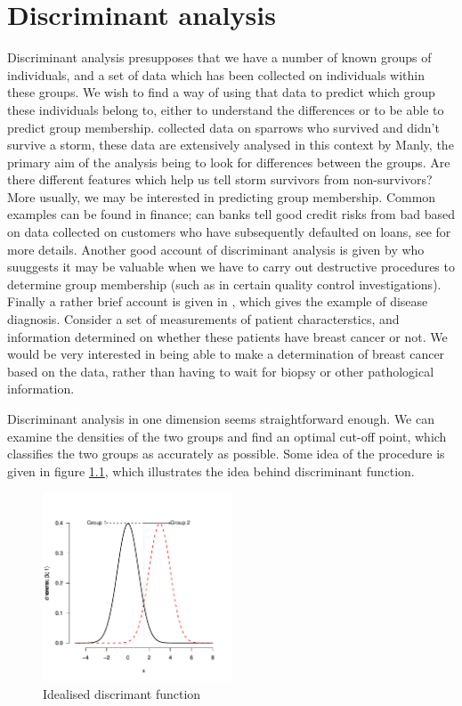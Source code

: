 \chapter{Discriminant analysis}
\label{discriminant}

Discriminant analysis presupposes that we have a number of known groups of individuals, and a set of data which has been collected on individuals within these groups.   We wish to find a way of using that data to predict which group these individuals belong to, either to understand the differences or to be able to predict group membership.  \cite{Bumpus:1898} collected data on sparrows who survived and didn't survive a storm, these data are extensively analysed in this context by Manly, the primary aim of the analysis being to look for differences between the groups.   Are there different features which help us tell storm survivors from non-survivors?   More usually, we may be interested in predicting group membership.   Common examples can be found in finance; can banks tell good credit risks from bad based on data collected on customers who have subsequently defaulted on loans, see \cite{Johnson+Wichern:2002} for more details.   Another good account of discriminant analysis is given by \cite{Flury:1997} who suuggests it may be valuable when we have to carry out destructive procedures to determine group membership (such as in certain quality control investigations).  Finally a rather brief account is given in \cite{Venables+Ripley:2002}, which gives the example of disease diagnosis.   Consider a set of measurements of patient characterstics, and information determined on whether these patients have breast cancer or not.   We would be very interested in being able to make a determination of breast cancer based on the data, rather than having to wait for biopsy or other pathological information.

Discriminant analysis in one dimension seems straightforward enough.   We can examine the densities of the two groups and find an optimal cut-off point, which classifies the two groups as accurately as possible.   Some idea of the procedure is given in figure \ref{discrim}, which illustrates the idea behind discriminant function.

\begin{figure}
\begin{center}
\includegraphics[width = 0.5\textwidth]{images/discrim}
\caption{Idealised discrimant function}
\label{discrim}
\end{center}
\end{figure}

